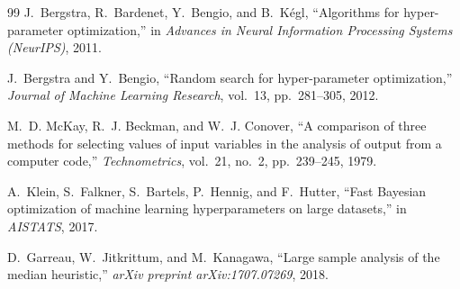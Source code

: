 \documentclass[11pt,letterpaper]{article}
\begin{document}
\begin{thebibliography}{99}
J.~Bergstra, R.~Bardenet, Y.~Bengio, and B.~K{\'e}gl, ``Algorithms for hyper-parameter optimization,'' in \emph{Advances in Neural Information Processing Systems (NeurIPS)}, 2011.

J.~Bergstra and Y.~Bengio, ``Random search for hyper-parameter optimization,'' \emph{Journal of Machine Learning Research}, vol.~13, pp.~281--305, 2012.

M.~D. McKay, R.~J. Beckman, and W.~J. Conover, ``A comparison of three methods for selecting values of input variables in the analysis of output from a computer code,'' \emph{Technometrics}, vol.~21, no.~2, pp.~239--245, 1979.

A.~Klein, S.~Falkner, S.~Bartels, P.~Hennig, and F.~Hutter, ``Fast Bayesian optimization of machine learning hyperparameters on large datasets,'' in \emph{AISTATS}, 2017.

D.~Garreau, W.~Jitkrittum, and M.~Kanagawa, ``Large sample analysis of the median heuristic,'' \emph{arXiv preprint arXiv:1707.07269}, 2018.

\end{thebibliography}
\end{document}
